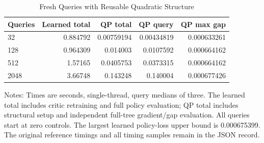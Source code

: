 \begin{table}[!htbp]
\centering\small
\caption{Fresh Queries with Reusable Quadratic Structure}
\label{tab:r6_qp}
\begin{tabular}{lrrrr}
\toprule
Queries & Learned total & QP total & QP query & QP max gap \\
\midrule
32 & 0.884792 & 0.00759194 & 0.00434819 & 0.000633261 \\
128 & 0.964309 & 0.014003 & 0.0107592 & 0.000664162 \\
512 & 1.57165 & 0.0405753 & 0.0373315 & 0.000664162 \\
2048 & 3.66748 & 0.143248 & 0.140004 & 0.000677426 \\
\bottomrule
\end{tabular}
\par\smallskip
\begin{minipage}{0.98\linewidth}\footnotesize
Notes: Times are seconds, single-thread, query medians of three. The learned total includes critic retraining and full policy evaluation; QP total includes structural setup and independent full-tree gradient/gap evaluation. All queries start at zero controls. The largest learned policy-loss upper bound is 0.000675399. The original reference timings and all timing samples remain in the JSON record.
\end{minipage}
\end{table}
